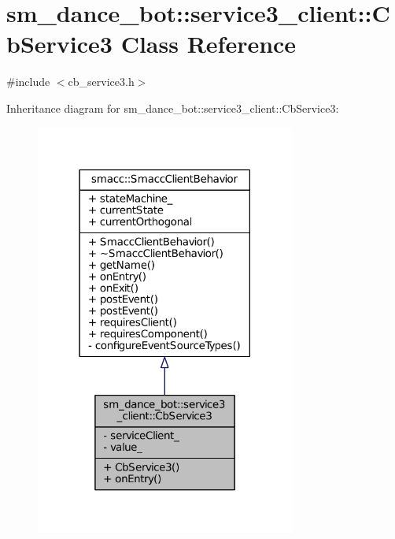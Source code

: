 \hypertarget{classsm__dance__bot_1_1service3__client_1_1CbService3}{}\section{sm\+\_\+dance\+\_\+bot\+:\+:service3\+\_\+client\+:\+:Cb\+Service3 Class Reference}
\label{classsm__dance__bot_1_1service3__client_1_1CbService3}


{\ttfamily \#include $<$cb\+\_\+service3.\+h$>$}



Inheritance diagram for sm\+\_\+dance\+\_\+bot\+:\+:service3\+\_\+client\+:\+:Cb\+Service3\+:
\nopagebreak
\begin{figure}[H]
\begin{center}
\leavevmode
\includegraphics[width=242pt]{classsm__dance__bot_1_1service3__client_1_1CbService3__inherit__graph}
\end{center}
\end{figure}


